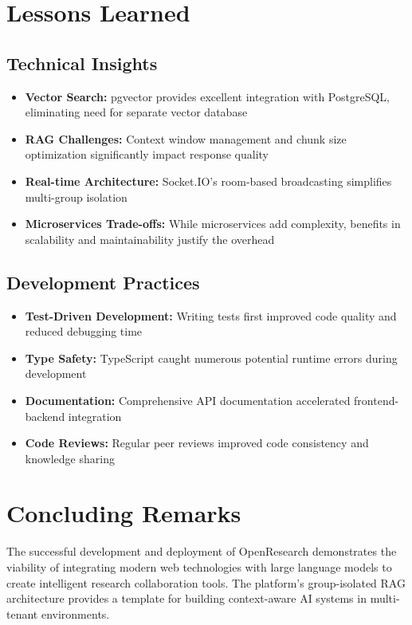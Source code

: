 \documentclass[12pt]{report}
\begin{document}
\section{Lessons Learned}

\subsection{Technical Insights}

\begin{itemize}
    \item \textbf{Vector Search:} pgvector provides excellent integration with PostgreSQL, eliminating need for separate vector database
    \item \textbf{RAG Challenges:} Context window management and chunk size optimization significantly impact response quality
    \item \textbf{Real-time Architecture:} Socket.IO's room-based broadcasting simplifies multi-group isolation
    \item \textbf{Microservices Trade-offs:} While microservices add complexity, benefits in scalability and maintainability justify the overhead
\end{itemize}

\subsection{Development Practices}

\begin{itemize}
    \item \textbf{Test-Driven Development:} Writing tests first improved code quality and reduced debugging time
    \item \textbf{Type Safety:} TypeScript caught numerous potential runtime errors during development
    \item \textbf{Documentation:} Comprehensive API documentation accelerated frontend-backend integration
    \item \textbf{Code Reviews:} Regular peer reviews improved code consistency and knowledge sharing
\end{itemize}

\section{Concluding Remarks}

The successful development and deployment of OpenResearch demonstrates the viability of integrating modern web technologies with large language models to create intelligent research collaboration tools. The platform's group-isolated RAG architecture provides a template for building context-aware AI systems in multi-tenant environments.
\end{document}
